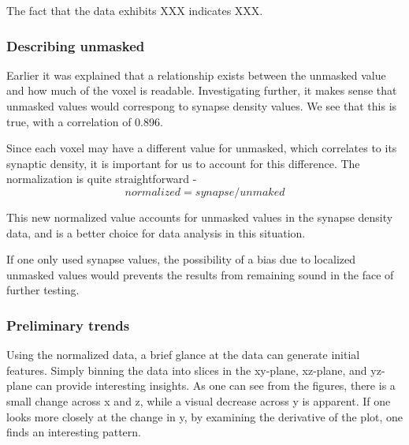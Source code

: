 \documentclass{article}
\begin{document}
The fact that the data exhibits XXX indicates XXX.

\subsubsection{Describing unmasked}

Earlier it was explained that a relationship exists between the unmasked value and how much of the voxel is readable. Investigating further, it makes sense that unmasked values would correspong to synapse density values. We see that this is true, with a correlation of 0.896.

Since each voxel may have a different value for unmasked, which correlates to its synaptic density, it is important for us to account for this difference. The normalization is quite straightforward - \[normalized = synapse/unmaked \]

This new normalized value accounts for unmasked values in the synapse density data, and is a better choice for data analysis in this situation.

If one only used synapse values, the possibility of a bias due to localized unmasked values would prevents the results from remaining sound in the face of further testing.

\subsubsection{Preliminary trends}

Using the normalized data, a brief glance at the data can generate initial features. Simply binning the data into slices in the xy-plane, xz-plane, and yz-plane can provide interesting insights. As one can see from the figures, there is a small change across x and z, while a visual decrease across y is apparent. If one looks more closely at the change in y, by examining the derivative of the plot, one finds an interesting pattern.
\end{document}

